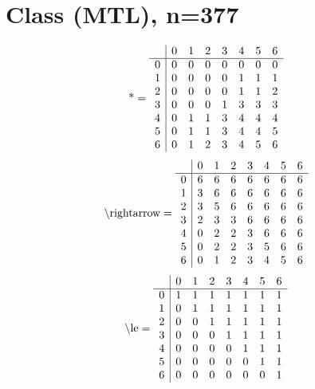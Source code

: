 \documentclass[11pt]{article}
\begin{document}
\section{Class (MTL), n=377}
\[\text{*} = 
\begin{array}{r | r r r r r r r}
 & 0 & 1 & 2 & 3 & 4 & 5 & 6 \\ \hline
0 & 0 & 0 & 0 & 0 & 0 & 0 & 0 \\
1 & 0 & 0 & 0 & 0 & 1 & 1 & 1 \\
2 & 0 & 0 & 0 & 0 & 1 & 1 & 2 \\
3 & 0 & 0 & 0 & 1 & 3 & 3 & 3 \\
4 & 0 & 1 & 1 & 3 & 4 & 4 & 4 \\
5 & 0 & 1 & 1 & 3 & 4 & 4 & 5 \\
6 & 0 & 1 & 2 & 3 & 4 & 5 & 6 \\
\end{array}
\]
\[\text{\textbackslash rightarrow} = 
\begin{array}{r | r r r r r r r}
 & 0 & 1 & 2 & 3 & 4 & 5 & 6 \\ \hline
0 & 6 & 6 & 6 & 6 & 6 & 6 & 6 \\
1 & 3 & 6 & 6 & 6 & 6 & 6 & 6 \\
2 & 3 & 5 & 6 & 6 & 6 & 6 & 6 \\
3 & 2 & 3 & 3 & 6 & 6 & 6 & 6 \\
4 & 0 & 2 & 2 & 3 & 6 & 6 & 6 \\
5 & 0 & 2 & 2 & 3 & 5 & 6 & 6 \\
6 & 0 & 1 & 2 & 3 & 4 & 5 & 6 \\
\end{array}
\]
\[\text{\textbackslash le} = 
\begin{array}{r | r r r r r r r}
 & 0 & 1 & 2 & 3 & 4 & 5 & 6 \\ \hline
0 & 1 & 1 & 1 & 1 & 1 & 1 & 1 \\
1 & 0 & 1 & 1 & 1 & 1 & 1 & 1 \\
2 & 0 & 0 & 1 & 1 & 1 & 1 & 1 \\
3 & 0 & 0 & 0 & 1 & 1 & 1 & 1 \\
4 & 0 & 0 & 0 & 0 & 1 & 1 & 1 \\
5 & 0 & 0 & 0 & 0 & 0 & 1 & 1 \\
6 & 0 & 0 & 0 & 0 & 0 & 0 & 1 \\
\end{array}
\]
\end{document}
